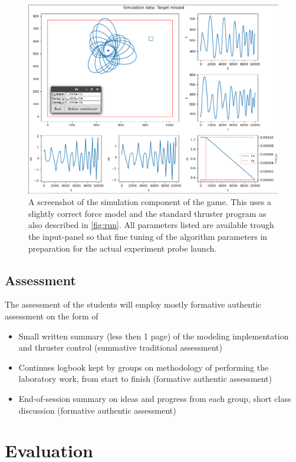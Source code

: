 \documentclass[11pt, twocolumn]{article}
\begin{document}
\begin{figure}
    \centering
    \includegraphics[width=0.9\hsize]{game_simulation.png}
    \caption{A screenshot of the simulation component of the game. This uses a slightly correct force model and the standard thruster program as also described in \ref{fig:run}. All parameters listed are available trough the input-panel so that fine tuning of the algorithm parameters in preparation for the actual experiment probe launch.}
    \label{fig:game_simulation}
\end{figure}

\subsection{Assessment}

The assessment of the students will employ mostly formative authentic assessment \citep{lombardi2008making, lyon2011problem} on the form of

\begin{itemize}
    \item Small written summary (less then 1 page) of the modeling implementation and thruster control (summative traditional assessment)
    \item Continues logbook kept by groups on methodology of performing the laboratory work, from start to finish (formative authentic assessment)
    \item End-of-session summary on ideas and progress from each group, short class discussion (formative authentic assessment)
\end{itemize}

\section{Evaluation}
\end{document}
